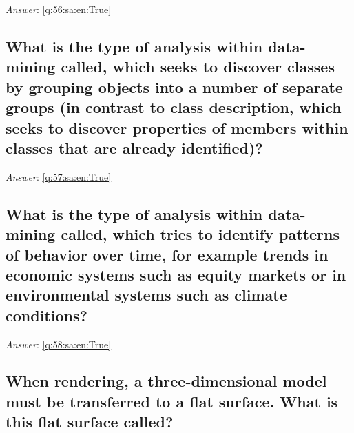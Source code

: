 \documentclass[a4paper,11pt,oneside]{article}
\begin{document}
\begin{sloppypar}
\textit{Answer}: \autoref{q:56:sa:en:True}



\subsection{What is the type of analysis within data-mining called, which seeks to discover classes by grouping objects into a number of separate groups (in contrast to class description, which seeks to discover properties of members within classes that are already identified)?}

\label{q:57:sa:en:False}

\vspace{2cm}

\noindent\makebox[\textwidth]{\hrulefill}

\vspace{1cm}

\textit{Answer}: \autoref{q:57:sa:en:True}



\subsection{What is the type of analysis within data-mining called, which tries to identify patterns of behavior over time, for example trends in economic systems such as equity markets or in environmental systems such as climate conditions?}

\label{q:58:sa:en:False}

\vspace{2cm}

\noindent\makebox[\textwidth]{\hrulefill}

\vspace{1cm}

\textit{Answer}: \autoref{q:58:sa:en:True}



\subsection{When rendering, a three-dimensional model must be transferred to a flat surface. What is this flat surface called?}

\label{q:59:sa:en:False}

\vspace{2cm}

\noindent\makebox[\textwidth]{\hrulefill}

\vspace{1cm}


\end{sloppypar}
\end{document}
